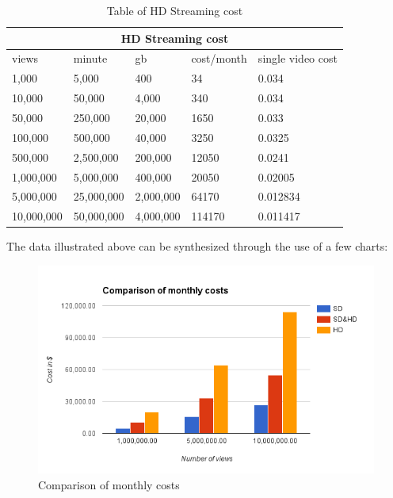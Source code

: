 \begin{table}
\centering 
\begin{tabular}{ |p{2cm}|p{2cm}|p{2cm}|p{2cm}|p{2cm}| }
  \hline
  \multicolumn{5}{|c|}{HD Streaming cost} \\
  \hline
  views & minute & gb & cost/month & single video cost\\
  \hline
1,000 & 5,000 & 400 & 34 & 0.034 \\
10,000 & 50,000 & 4,000 & 340 & 0.034\\
50,000 & 250,000 & 20,000 & 1650 & 0.033\\
100,000 & 500,000 & 40,000 & 3250 & 0.0325\\
500,000 & 2,500,000 & 200,000 & 12050 & 0.0241\\
1,000,000 & 5,000,000 & 400,000 & 20050 & 0.02005\\
5,000,000 & 25,000,000 & 2,000,000 & 64170 & 0.012834\\
10,000,000 & 50,000,000 & 4,000,000 & 114170 & 0.011417\\
  \hline
\end{tabular}
\caption{Table of HD Streaming cost}
\label{table:1}
\end{table}

The data illustrated above can be synthesized through the use of a few charts:

\begin{figure}[htb]
 \centering
 \includegraphics[width=1.0\linewidth]{images/chapter2/grafico.png}\hfill
 \caption[Comparison of monthly costs]{Comparison of monthly costs}
 \label{fig:fourV}
\end{figure}
